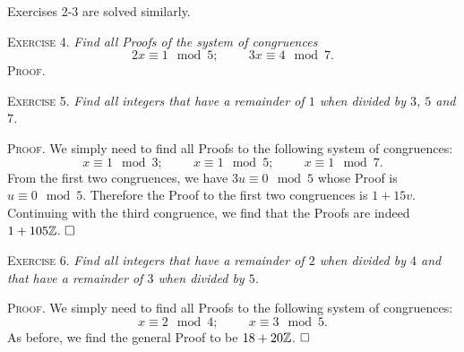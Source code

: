 \documentclass[11pt, leqno]{article}
\newcommand{\done}{\ensuremath{\hfill\square}}
\begin{document}
Exercises 2-3 are solved similarly.

\textsc{Exercise 4}. \emph{Find all Proofs of the system of congruences 
\begin{displaymath}
2x \equiv 1 \mod 5; \hspace{1cm} 3x\equiv 4 \mod 7. 
\end{displaymath}}\textsc{Proof}.

\textsc{Exercise 5}. \emph{Find all integers that have a remainder of $1$ when divided by $3$, $5$ and $7$.}

\textsc{Proof}. We simply need to find all Proofs to the following system of congruences: 
\begin{displaymath}
x\equiv 1 \mod 3; \hspace{1cm} x\equiv 1 \mod 5; \hspace{1cm} x \equiv 1 \mod 7.
\end{displaymath}
From the first two congruences, we have $3u \equiv 0\mod 5$ whose Proof is $u\equiv 0 \mod 5$. Therefore the Proof to the first two congruences is $1+15v$. Continuing with the third congruence, we find that the Proofs are indeed $1+105\mathbb{Z}$. \done

\textsc{Exercise 6}. \emph{Find all integers that have a remainder of $2$ when divided by $4$ and that have a remainder of $3$ when divided by $5$.}

\textsc{Proof}. We simply need to find all Proofs to the following system of congruences: 
\begin{displaymath}
x\equiv 2 \mod 4; \hspace{1cm} x\equiv 3 \mod 5.
\end{displaymath}
As before, we find the general Proof to be $18+20\mathbb{Z}$. \done
\end{document}

